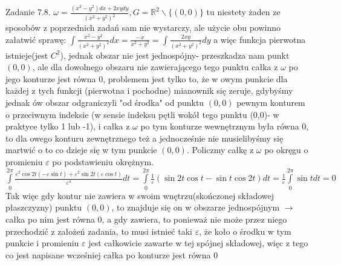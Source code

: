 \documentclass{article}
\begin{document}
Zadanie 7.8.
\newline
\newline
$
\omega=\frac{(x^2-y^2)dx+2xydy}{(x^2+y^2)^2},G=\mathbb{R}^2\backslash\{(0,0)\}
$
tu niestety żaden ze sposobów z poprzednich zadań sam nie wystarczy, ale użycie obu powinno załatwić sprawę:\newline
$
\int\frac{x^2-y^2}{(x^2+y^2)^2}dx=\frac{-x}{x^2+y^2}=\int\frac{2xy}{(x^2+y^2)^2}dy
$ a więc funkcja pierwotna istnieje(jest $C^2$), jednak obszar nie jest jednospójny- przeszkadza nam punkt $(0,0)$,
ale dla dowolnego obszaru nie zawierającego tego punktu całka z $\omega$ po jego konturze jest równa 0, problemem jest tylko to, że w owym punkcie dla każdej z tych
funkcji (pierwotna i pochodne) mianownik się zeruje, gdybyśmy jednak ów obszar odgraniczyli "od środka" od punktu $(0,0)$ pewnym konturem o przeciwnym indeksie 
(w sensie indeksu pętli wokół tego punktu (0,0)- w praktyce tylko 1 lub -1), i całka z $\omega$ po tym konturze wewnętrznym była równa 0, to dla owego konturu zewnętrznego też
a jednocześnie nie musielibyśmy się martwić o to co dzieje się w tym punkcie $(0,0)$.
Policzmy całkę z $\omega$ po okręgu o promieniu $\varepsilon$ po podstawieniu okrężnym.
$
\int\limits_{0}^{2\pi}\frac{\varepsilon^2\cos{2t}(-\varepsilon\sin{t})+\varepsilon^2\sin{2t(\varepsilon\cos{t})}}{\varepsilon^4}dt
=
\int\limits_{0}^{2\pi}\frac{1}{\varepsilon}(\sin{2t}\cos{t}-\sin{t}\cos{2t})dt
=
\frac{1}{\varepsilon}\int\limits_{0}^{2\pi}\sin{t}dt=0
$\newline
Tak więc gdy kontur nie zawiera w swoim wnętrzu(skończonej składowej płaszczyzny) punktu $(0,0)$, to znajduje się on w obszarze jednospójnym $\rightarrow$całka po nim jest równa
0, a gdy zawiera, to ponieważ nie może przez niego przechodzić z założeń zadania, to musi istnieć taki $\varepsilon$, że koło o środku w tym punkcie i promieniu
$\varepsilon$ jest całkowicie zawarte w tej spójnej składowej, więc z tego co jest napisane wcześniej całka po konturze jest równa 0
\end{document}
